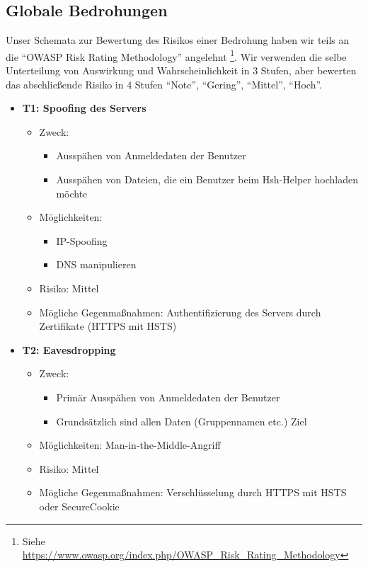 \documentclass[12pt,DIV14,BCOR10mm,a4paper,parskip=half-,headsepline,headinclude,english,ngerman,bibliography=totocnumbered]{scrreprt}
\begin{document}
\subsection{Globale Bedrohungen}

Unser Schemata zur Bewertung des Risikos einer Bedrohung haben wir teils an die \enquote{OWASP Risk Rating Methodology} angelehnt \footnote{Siehe \url{https://www.owasp.org/index.php/OWASP_Risk_Rating_Methodology}}. Wir verwenden die selbe Unterteilung von Auswirkung und Wahrscheinlichkeit in 3 Stufen, aber bewerten das abschließende Risiko in 4 Stufen \enquote{Note}, \enquote{Gering}, \enquote{Mittel}, \enquote{Hoch}.

\begin{itemize}

  \hypertarget{threat1}{}
  \item \textbf{T1: Spoofing des Servers}
  \begin{itemize}
  \item Zweck:
  	\begin{itemize}
  		\item Ausspähen von Anmeldedaten der Benutzer
  		\item Ausspähen von Dateien, die ein Benutzer beim Hsh-Helper hochladen möchte
  	\end{itemize}
  \item Möglichkeiten:
  	\begin{itemize}
  		\item IP-Spoofing
  		\item DNS manipulieren
  	\end{itemize}
  \item Risiko: Mittel
  \item Mögliche Gegenmaßnahmen: Authentifizierung des Servers durch Zertifikate (HTTPS mit HSTS)
  \end{itemize}

  \hypertarget{threat2}{}
  \item \textbf{T2: Eavesdropping}
  \begin{itemize}
  \item Zweck:
  	\begin{itemize}
  		\item Primär Ausspähen von Anmeldedaten der Benutzer
  		\item Grundsätzlich sind allen Daten (Gruppennamen etc.) Ziel
  	\end{itemize}
  \item Möglichkeiten: Man-in-the-Middle-Angriff
  \item Risiko: Mittel
  \item Mögliche Gegenmaßnahmen: Verschlüsselung durch HTTPS mit HSTS oder SecureCookie
  \end{itemize}


\end{itemize}
\end{document}
